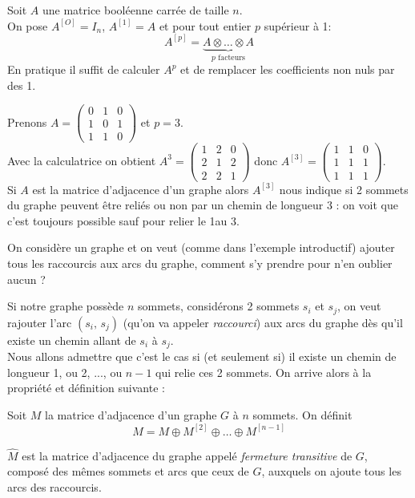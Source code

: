 \documentclass[a4paper,12pt]{book}
\begin{document}
\begin{definition}

Soit $A$ une matrice booléenne carrée de taille $n$.\\
On pose $A^{[O]}=I_n$, $A^{[1]}=A$ et pour tout entier $p$ supérieur à 1:
$$A^{[p]}=\underbrace{A\otimes\ldots \otimes A}_{p\text{\ facteurs}}$$
En pratique il suffit de calculer $A^p$ et de remplacer les coefficients non nuls par des 1.
\end{definition}

\begin{exemple}[]
Prenons $A =\begin{pmatrix}
0 & 1 & 0\\1&0&1\\1&1&0
\end{pmatrix}$ et $p=3$.\\
Avec la calculatrice on obtient $A^3 =\begin{pmatrix}
1 & 2 & 0\\2&1&2\\2&2&1
\end{pmatrix}$ donc $A^{[3]} =\begin{pmatrix}
1 & 1 & 0\\1&1&1\\1&1&1
\end{pmatrix}$.\\

Si $A$ est la matrice d'adjacence d'un graphe alors $A^{[3]}$ nous indique si 2 sommets du graphe peuvent être reliés ou non par un chemin de longueur 3 : on voit que c'est toujours possible sauf pour relier le 1\er au 3\eme.
\end{exemple}


On considère un graphe et on veut (comme dans l'exemple introductif) ajouter tous les \og raccourcis\fg{} aux arcs du graphe, comment s'y prendre pour n'en oublier aucun ?

Si notre graphe possède $n$ sommets, considérons 2 sommets $s_i$ et $s_j$, on veut rajouter l'arc $(s_i,\, s_j)$ (qu'on va appeler \textit{raccourci}) aux arcs du graphe dès qu'il existe un chemin allant de $s_i$ à $s_j$.\\
Nous allons admettre que c'est le cas si (et seulement si) il existe un chemin de longueur 1, ou 2, ..., ou $n-1$ qui relie ces 2 sommets. On arrive alors à la propriété et définition suivante :

\begin{propriete}[ et définition]
Soit $M$ la matrice d'adjacence d'un graphe $G$ à $n$ sommets. On définit
$$\widehat{M}=M\oplus M^{[2]}\oplus\ldots\oplus M^{[n-1]}$$

$\widehat{M}$ est la matrice d'adjacence du graphe appelé \textit{fermeture transitive} de $G$, composé des mêmes sommets et arcs que ceux de $G$, auxquels on ajoute tous les arcs des \og raccourcis\fg{}.
\end{propriete}
\end{document}

